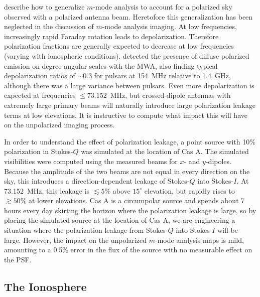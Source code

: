 \documentclass[twocolumn]{aastex61}
\begin{document}
\citet{2015PhRvD..91h3514S} describe how to generalize $m$-mode analysis to account for a polarized
sky observed with a polarized antenna beam. Heretofore this generalization has been neglected in the
discussion of $m$-mode analysis imaging.  At low frequencies, increasingly rapid Faraday rotation
leads to depolarization. Therefore polarization fractions are generally expected to decrease at low
frequencies (varying with ionospheric conditions). \citet{2016ApJ...830...38L} detected the presence
of diffuse polarized emission on degree angular scales with the MWA, also finding typical
depolarization ratios of $\sim0.3$ for pulsars at 154~MHz relative to 1.4~GHz, although there was a
large variance between pulsars. Even more depolarization is expected at frequencies $\le
73.152$~MHz, but crossed-dipole antennas with extremely large primary beams will naturally introduce
large polarization leakage terms at low elevations.  It is instructive to compute what impact this
will have on the unpolarized imaging process.

In order to understand the effect of polarization leakage, a point source with 10\% polarization in
Stokes-$Q$ was simulated at the location of Cas A.  The simulated visibilities were computed using
the measured beams for $x$- and $y$-dipoles. Because the amplitude of the two beams are not equal in
every direction on the sky, this introduces a direction-dependent leakage of Stokes-$Q$ into
Stokes-$I$. At 73.152~MHz, this leakage is $\lesssim5\%$ above $15^\circ$ elevation, but rapidly
rises to $\gtrsim50\%$ at lower elevations. Cas A is a circumpolar source and spends about 7 hours
every day skirting the horizon where the polarization leakage is large, so by placing the simulated
source at the location of Cas A, we are engineering a situation where the polarization leakage from
Stokes-$Q$ into Stokes-$I$ will be large. However, the impact on the unpolarized $m$-mode analysis
maps is mild, amounting to a 0.5\% error in the flux of the source with no measurable effect on the
PSF.

\subsection{The Ionosphere}\label{sec:ionosphere}
\end{document}
